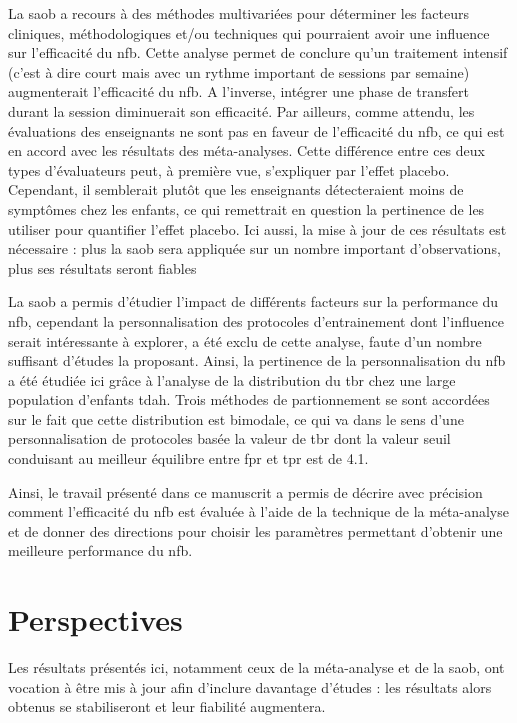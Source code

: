 La \gls{saob} a recours à des méthodes multivariées pour déterminer les facteurs cliniques, méthodologiques et/ou techniques qui pourraient avoir une influence sur l'efficacité du \gls{nfb}. 
Cette analyse permet de conclure qu'un traitement intensif (c'est à dire court mais avec un rythme important de sessions par semaine) augmenterait l'efficacité du \gls{nfb}. A l'inverse,  
intégrer une phase de transfert durant la session diminuerait son efficacité. Par ailleurs, comme attendu, les évaluations des enseignants ne sont pas en faveur de l'efficacité du \gls{nfb}, 
ce qui est en accord avec les résultats des méta-analyses. Cette différence entre ces deux types d'évaluateurs 
peut, à première vue, s'expliquer par l'effet placebo. Cependant, il semblerait plutôt que les enseignants détecteraient moins de symptômes chez les enfants, ce qui remettrait en question la
pertinence de les utiliser pour quantifier l'effet placebo. Ici aussi, la mise à jour de ces résultats est nécessaire : plus la \gls{saob} sera appliquée sur un nombre important d'observations,
plus ses résultats seront fiables

La \gls{saob} a permis d'étudier l'impact de différents facteurs sur la performance du \gls{nfb}, cependant la personnalisation des protocoles d'entrainement dont l'influence serait intéressante 
à explorer, a été exclu de cette analyse, faute d'un nombre suffisant d'études la proposant. Ainsi, la pertinence de la personnalisation du \gls{nfb} a été étudiée ici grâce à l'analyse de la distribution 
du \gls{tbr} chez une large population d'enfants \gls{tdah}. Trois méthodes de partionnement se sont accordées sur le fait que cette distribution est bimodale, ce qui va dans 
le sens d'une personnalisation de protocoles basée la valeur de \gls{tbr} dont la valeur seuil conduisant au meilleur équilibre entre \gls{fpr} et \gls{tpr} est de 4.1. 

Ainsi, le travail présenté dans ce manuscrit a permis de décrire avec précision comment l'efficacité du \gls{nfb} est évaluée à l'aide de la technique de la méta-analyse et de donner des 
directions pour choisir les paramètres permettant d'obtenir une meilleure performance du \gls{nfb}.


\section{Perspectives}

Les résultats présentés ici, notamment ceux de la méta-analyse et de la \gls{saob}, ont vocation à être mis à jour afin d'inclure davantage d'études : les résultats alors obtenus se 
stabiliseront et leur fiabilité augmentera.   

